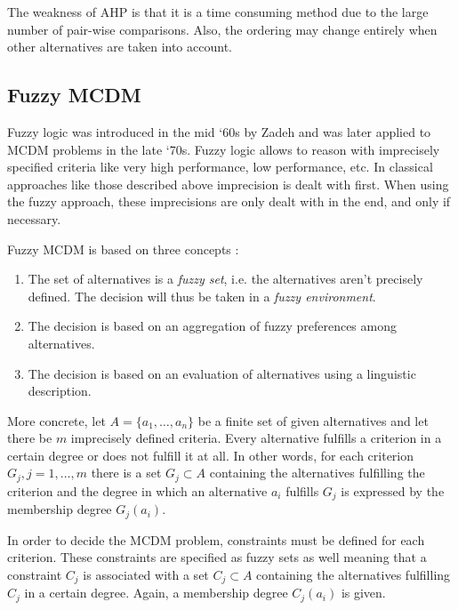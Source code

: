 

The weakness of AHP is that it is a time consuming method due to the large number of pair-wise comparisons. Also, the ordering may change entirely when other alternatives are taken into account.

\subsection{Fuzzy MCDM}
\label{sec:fuzzy}


Fuzzy logic was introduced in the mid `60s by Zadeh and was later applied to MCDM problems in the late `70s. Fuzzy logic allows to reason with imprecisely specified criteria like very high performance, low performance, etc. In classical approaches like those described above imprecision is dealt with first. When using the fuzzy approach, these imprecisions are only dealt with in the end, and only if necessary.

Fuzzy MCDM is based on three concepts \cite{FuzzySetApproach}:

\begin{enumerate}
    \item The set of alternatives is a \emph{fuzzy set}, i.e. the alternatives aren't precisely defined. The decision will thus be taken in a \emph{fuzzy environment}. 
    \item The decision is based on an aggregation of fuzzy preferences among alternatives.
    \item The decision is based on an evaluation of alternatives using a linguistic description.
\end{enumerate}

More concrete, let $A = \{a_1, \ldots, a_n\}$ be a finite set of given alternatives and let there be $m$ imprecisely defined criteria. Every alternative fulfills a criterion in a certain degree or does not fulfill it at all. In other words, for each criterion $G_j, j = 1, \ldots, m$ there is a set $G_j \subset A$ containing the alternatives fulfilling the criterion and the degree in which an alternative $a_i$ fulfills $G_j$ is expressed by the membership degree $G_j(a_i)$.

In order to decide the MCDM problem, constraints must be defined for each criterion. These constraints are specified as fuzzy sets as well meaning that a constraint $C_j$ is associated with a set $C_j \subset A$ containing the alternatives fulfilling $C_j$ in a certain degree. Again, a membership degree $C_j(a_i)$ is given.

